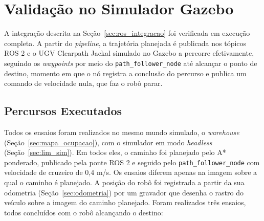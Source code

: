\documentclass[
    12pt,
    openright,
    oneside,
    a4paper,
    english,
    brazil
]{abntex2}
\begin{document}
\section{Validação no Simulador Gazebo}
\label{sec:res_gazebo}

A integração descrita na Seção~\ref{sec:ros_integracao} foi verificada em execução completa. A partir do \textit{pipeline}, a trajetória planejada é publicada nos tópicos ROS 2 e o UGV Clearpath Jackal simulado no Gazebo a percorre efetivamente, seguindo os \textit{waypoints} por meio do \texttt{path\_\allowbreak{}follower\_\allowbreak{}node} até alcançar o ponto de destino, momento em que o nó registra a conclusão do percurso e publica um comando de velocidade nula, que faz o robô parar.

\subsection{Percursos Executados}

Todos os ensaios foram realizados no mesmo mundo simulado, o \textit{warehouse} (Seção~\ref{sec:mapa_ocupacao}), com o simulador em modo \textit{headless} (Seção~\ref{sec:lim_sim}). Em todos eles, o caminho foi planejado pelo A* ponderado, publicado pela ponte ROS 2 e seguido pelo \texttt{path\_\allowbreak{}follower\_\allowbreak{}node} com velocidade de cruzeiro de 0,4 m/s. Os ensaios diferem apenas na imagem sobre a qual o caminho é planejado. A posição do robô foi registrada a partir da sua odometria (Seção~\ref{sec:odometria}) por um gravador que desenha o rastro do veículo sobre a imagem do caminho planejado. Foram realizados três ensaios, todos concluídos com o robô alcançando o destino:
\end{document}
